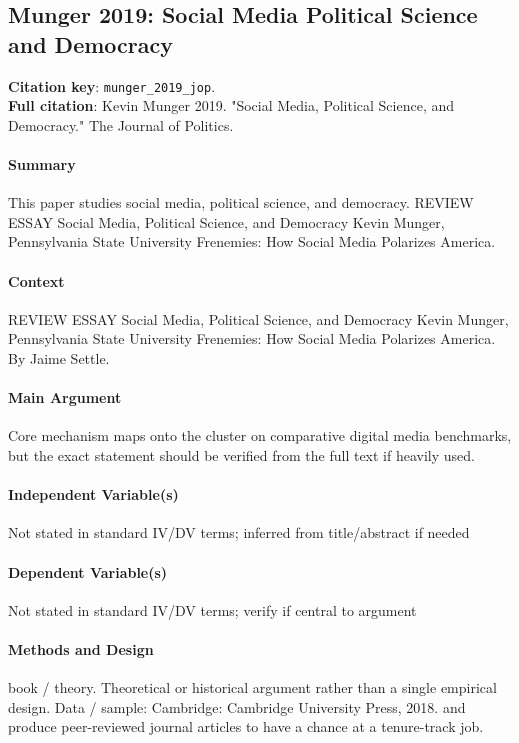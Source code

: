 \documentclass[12pt]{article}
\begin{document}
\subsection{Munger 2019: Social Media Political Science and Democracy}
\textbf{Citation key}: \texttt{munger\_2019\_jop}.\\
\textbf{Full citation}: Kevin Munger 2019. "Social Media, Political Science, and Democracy." The Journal of Politics.

\paragraph{Summary} This paper studies social media, political science, and democracy. REVIEW ESSAY Social Media, Political Science, and Democracy Kevin Munger, Pennsylvania State University Frenemies: How Social Media Polarizes America.

\paragraph{Context} REVIEW ESSAY Social Media, Political Science, and Democracy Kevin Munger, Pennsylvania State University Frenemies: How Social Media Polarizes America. By Jaime Settle.

\paragraph{Main Argument} Core mechanism maps onto the cluster on comparative digital media benchmarks, but the exact statement should be verified from the full text if heavily used.

\paragraph{Independent Variable(s)} Not stated in standard IV/DV terms; inferred from title/abstract if needed

\paragraph{Dependent Variable(s)} Not stated in standard IV/DV terms; verify if central to argument

\paragraph{Methods and Design} book / theory. Theoretical or historical argument rather than a single empirical design. Data / sample: Cambridge: Cambridge University Press, 2018. and produce peer-reviewed journal articles to have a chance at a tenure-track job.
\end{document}
